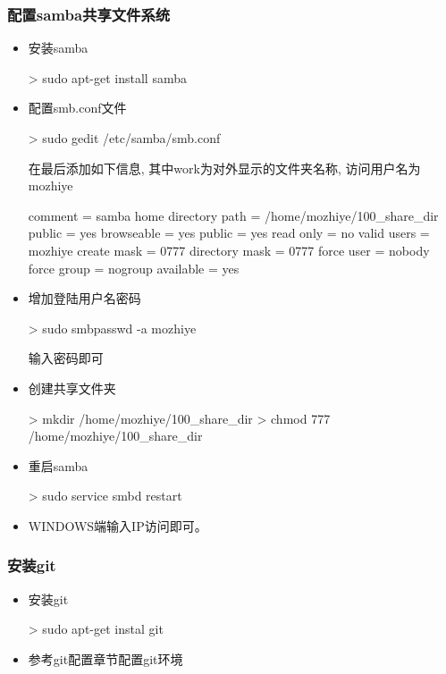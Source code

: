 \subsubsection{配置samba共享文件系统}
\begin{itemize}
\item 安装samba
\begin{commandbox}
 > sudo apt-get install samba
\end{commandbox}

\item 配置smb.conf文件
\begin{commandbox}
 > sudo gedit /etc/samba/smb.conf
\end{commandbox}
在最后添加如下信息, 其中work为对外显示的文件夹名称, 访问用户名为mozhiye
\begin{messagebox}
[work]
    comment = samba home directory 
    path = /home/mozhiye/100_share_dir
    public = yes
    browseable = yes
    public = yes
    read only = no
    valid users = mozhiye
    create mask = 0777
    directory mask = 0777 
    force user = nobody
    force group = nogroup
    available = yes
\end{messagebox}

\item 增加登陆用户名密码
\begin{commandbox}
 > sudo smbpasswd -a mozhiye
\end{commandbox}
输入密码即可

\item 创建共享文件夹
\begin{commandbox}
 > mkdir /home/mozhiye/100_share_dir
 > chmod 777 /home/mozhiye/100_share_dir
\end{commandbox}

\item 重启samba
\begin{commandbox}
 > sudo service smbd restart
\end{commandbox}

\item WINDOWS端输入IP访问即可。
\end{itemize}

\subsubsection{安装git}
\begin{itemize}
\item 安装git
\begin{commandbox}
 > sudo apt-get instal git
\end{commandbox}

\item 参考git配置章节配置git环境
\end{itemize}

